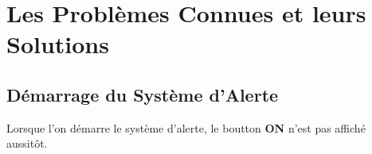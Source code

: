 \chapter{Les Probl\`emes Connues et leurs Solutions}\label{chap:problemes-connues}


\vspace{2cm}

\section{D\'emarrage du Syst\`eme d'Alerte}

Lorsque l'on d\'emarre le syst\`eme d'alerte,
le boutton \textbf{\textcolor{yerenColorGreen}{ON}}
n'est pas affich\'e aussit\^ot.
